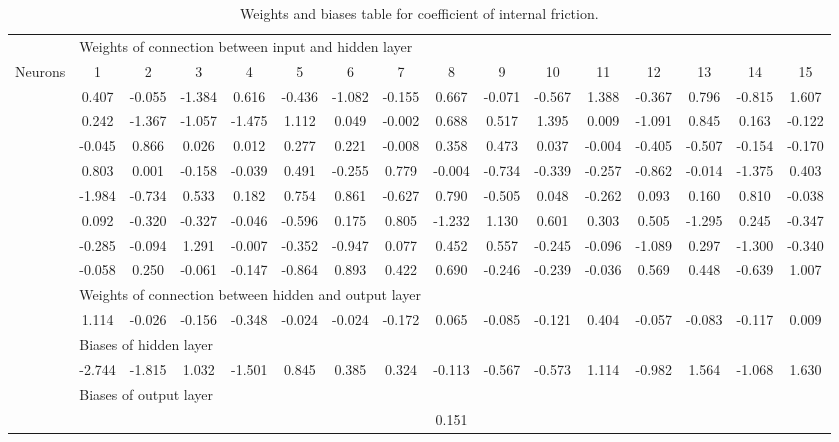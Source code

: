 \begin{sidewaystable}[htbp] 
 \centering 
\begin{tabular}{l|ccccccccccccccc} 
 \hline 
   &    \multicolumn{15}{l}{Weights of connection between input and hidden layer}  \\ 
 Neurons & 1 &  2 &  3 &  4 &  5 &  6 &  7 &  8 & 9 & 10 & 11 & 12 & 13 & 14 & 15  \\ 
 \hline 
  & 0.407 &  -0.055 &  -1.384 &  0.616 &  -0.436 &  -1.082 &  -0.155 &  0.667 &  -0.071  &  -0.567 &  1.388 &  -0.367 &  0.796 &  -0.815 &  1.607 \\ 
  & 0.242 &  -1.367 &  -1.057 &  -1.475 &  1.112 &  0.049 &  -0.002 &  0.688 &  0.517  &  1.395 &  0.009 &  -1.091 &  0.845 &  0.163 &  -0.122 \\ 
  & -0.045 &  0.866 &  0.026 &  0.012 &  0.277 &  0.221 &  -0.008 &  0.358 &  0.473  &  0.037 &  -0.004 &  -0.405 &  -0.507 &  -0.154 &  -0.170 \\ 
  & 0.803 &  0.001 &  -0.158 &  -0.039 &  0.491 &  -0.255 &  0.779 &  -0.004 &  -0.734  &  -0.339 &  -0.257 &  -0.862 &  -0.014 &  -1.375 &  0.403 \\ 
  & -1.984 &  -0.734 &  0.533 &  0.182 &  0.754 &  0.861 &  -0.627 &  0.790 &  -0.505  &  0.048 &  -0.262 &  0.093 &  0.160 &  0.810 &  -0.038 \\ 
  & 0.092 &  -0.320 &  -0.327 &  -0.046 &  -0.596 &  0.175 &  0.805 &  -1.232 &  1.130  &  0.601 &  0.303 &  0.505 &  -1.295 &  0.245 &  -0.347 \\ 
  & -0.285 &  -0.094 &  1.291 &  -0.007 &  -0.352 &  -0.947 &  0.077 &  0.452 &  0.557  &  -0.245 &  -0.096 &  -1.089 &  0.297 &  -1.300 &  -0.340 \\ 
  & -0.058 &  0.250 &  -0.061 &  -0.147 &  -0.864 &  0.893 &  0.422 &  0.690 &  -0.246  &  -0.239 &  -0.036 &  0.569 &  0.448 &  -0.639 &  1.007 \\ 
\hline 
   &    \multicolumn{15}{l}{Weights of connection between hidden and output layer}  \\ 
  & 1.114 &  -0.026 &  -0.156 &  -0.348 &  -0.024 &  -0.024 &  -0.172 &  0.065 &  -0.085  &  -0.121 &  0.404 &  -0.057 &  -0.083 &  -0.117 &  0.009 \\ 
\hline 
   &    \multicolumn{15}{l}{Biases of hidden layer}  \\ 
  & -2.744 &  -1.815 &  1.032 &  -1.501 &  0.845 &  0.385 &  0.324 &  -0.113 &  -0.567  &  -0.573 &  1.114 &  -0.982 &  1.564 &  -1.068 &  1.630 \\ 
\hline 
   &    \multicolumn{15}{l}{Biases of output layer}  \\ 
 &    \multicolumn{15}{c}{0.151}  \\ 
\hline 
 \end{tabular} 
\caption[Weights and biases table for coefficient of internal friction]{Weights and biases table for coefficient of internal friction.} 
\label{tab:33weightsbiasesmuie} 
\end{sidewaystable}